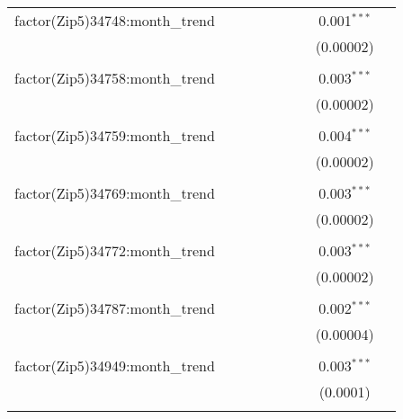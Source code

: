 \begin{table}[H]
{\begin{tabular}{@{\extracolsep{5pt}}lcccccccc}
  factor(Zip5)34748:month\_trend &  &  &  &  &  &  & 0.001$^{***}$ &  \\  

   &  &  &  &  &  &  & (0.00002) &  \\  

   & & & & & & & & \\  

  factor(Zip5)34758:month\_trend &  &  &  &  &  &  & 0.003$^{***}$ &  \\  

   &  &  &  &  &  &  & (0.00002) &  \\  

   & & & & & & & & \\  

  factor(Zip5)34759:month\_trend &  &  &  &  &  &  & 0.004$^{***}$ &  \\  

   &  &  &  &  &  &  & (0.00002) &  \\  

   & & & & & & & & \\  

  factor(Zip5)34769:month\_trend &  &  &  &  &  &  & 0.003$^{***}$ &  \\  

   &  &  &  &  &  &  & (0.00002) &  \\  

   & & & & & & & & \\  

  factor(Zip5)34772:month\_trend &  &  &  &  &  &  & 0.003$^{***}$ &  \\  

   &  &  &  &  &  &  & (0.00002) &  \\  

   & & & & & & & & \\  

  factor(Zip5)34787:month\_trend &  &  &  &  &  &  & 0.002$^{***}$ &  \\  

   &  &  &  &  &  &  & (0.00004) &  \\  

   & & & & & & & & \\  

  factor(Zip5)34949:month\_trend &  &  &  &  &  &  & 0.003$^{***}$ &  \\  

   &  &  &  &  &  &  & (0.0001) &  \\  

   & & & & & & & & \\  


\end{tabular}}
\end{table}

